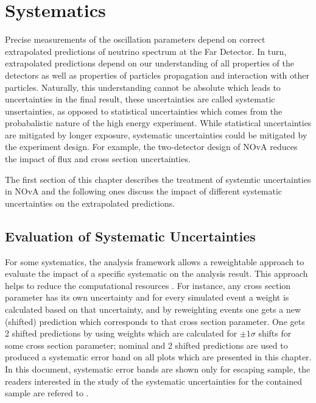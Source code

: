 \chapter{Systematics}
\label{systematic_chapter}

Precise measurements of the oscillation parameters depend on correct extrapolated predictions of neutrino spectrum at 
the Far Detector. In turn, extrapolated predictions depend on our understanding of all properties of the detectors as
well as properties of particles propagation and interaction with other particles. Naturally, this understanding cannot 
be absolute which leads to uncertainties in the final result, these uncertainties are called systematic 
unsertainties, as opposed to statistical uncertainties which comes from the probabalistic nature of the high energy experiment.
While statistical uncertainties are mitigated by longer exposure, systematic uncertainties could be mitigated by the
experiment design. For example, the two-detector design of NOvA reduces the impact of flux and cross section uncertainties.

The first section of this chapter describes the treatment of systemtic uncertainties in NOvA and the following ones
discuss the impact of different systematic uncertainties on the extrapolated predictions. 

\section{Evaluation of Systematic Uncertainties}
For some systematics, the analysis framework allows a reweightable approach to evaluate the impact of a specific systematic
on the analysis result. This approach helps to reduce the computational resources \cite{cafana}. For instance, any cross section 
parameter has its own uncertainty and for every simulated event a weight is calculated based on that uncertainty, and 
by reweighting events one gets a new (shifted) prediction which 
corresponds to that cross section parameter. One gets 2 shifted predictions by using weights which are calculated for 
$\pm 1\sigma$ shifts for some cross section parameter; nominal and 2 shifted predictions are used to produced a 
systematic error band on all plots which are presented in this chapter. In this document, systematic 
error bands are shown only for escaping sample, the readers interested in the study of the systematic uncertainties 
for the contained sample are refered to \cite{Luke}.

